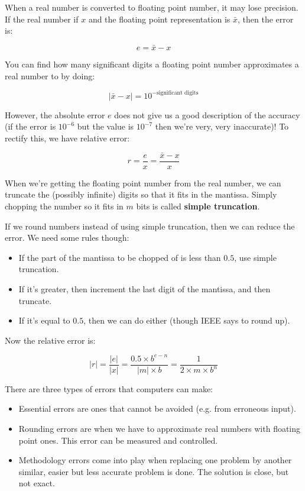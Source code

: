 
When a real number is converted to floating point number, it may lose precision.
If the real number if $x$ and the floating point representation is
$\bar{x}$, then the error is:

\[
  e = \bar{x} - x
\]

You can find how many significant digits a floating point number approximates a
real number to by doing:

\[
  |\bar{x} - x| = 10^{-\text{significant digits}}
\]


However, the absolute error $e$ does not give us a good description of the
accuracy (if the error is $10^{-6}$ but the value is $10^{-7}$ then we're very,
very inaccurate)! To rectify this, we have relative error:

\[
  r = \frac{e}{x} = \frac{\bar{x} - x}{x}
\]


When we're getting the floating point number from the real number, we can
truncate the (possibly infinite) digits so that it fits in the mantissa. Simply
chopping the number so it fits in $m$ bits is called \textbf{simple truncation}.

If we round numbers instead of using simple truncation, then we can reduce the
error. We need some rules though:

\begin{itemize}
  \item If the part of the mantissa to be chopped of is less than $0.5$, use
  simple truncation.
  \item If it's greater, then increment the last digit of the mantissa, and then
  truncate.
  \item If it's equal to $0.5$, then we can do either (though IEEE says to round
  up).
\end{itemize}

Now the relative error is:

\[
  |r| = \frac{|e|}{|x|} = \frac{0.5 \times b^{e-n}}{|m|\times b}
      = \frac{1}{2 \times m \times b^n}
\]

There are three types of errors that computers can make:

\begin{itemize}
  \item Essential errors are ones that cannot be avoided (e.g. from erroneous
  input).
  \item Rounding errors are when we have to approximate real numbers with
  floating point ones. This error can be measured and controlled.
  \item Methodology errors come into play when replacing one problem by another
  similar, easier but less accurate problem is done. The solution is close, but
  not exact.
\end{itemize}

